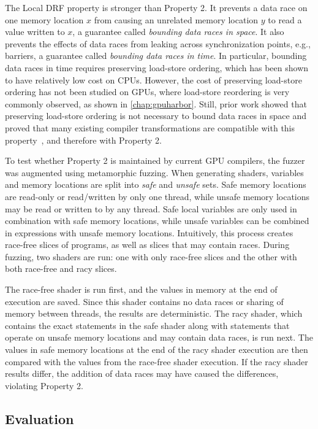 The Local DRF property is stronger than \smsg Property 2. It prevents a data race on one memory location $x$ from causing an unrelated memory location $y$ to read a value written to $x$, a guarantee called \textit{bounding data races in space}. It also prevents the effects of data races from leaking across synchronization points, e.g., barriers, a guarantee called \textit{bounding data races in time}. In particular, bounding data races in time requires preserving load-store ordering, which has been shown to have relatively low cost on CPUs. However, the cost of preserving load-store ordering has not been studied on GPUs, where load-store reordering is very commonly observed, as shown in \mychap\ref{chap:gpuharbor}. Still, prior work showed that preserving load-store ordering is not necessary to bound data races in space and proved that many existing compiler transformations are compatible with this property~\cite{dolan2018bounding}, and therefore with \smsg Property 2.

To test whether \smsg Property 2 is maintained by current GPU compilers, the \wgslmemsmith fuzzer was augmented using metamorphic fuzzing. When generating shaders, variables and memory locations are split into \textit{safe} and \textit{unsafe} sets. Safe memory locations are read-only or read/written by only one thread, while unsafe memory locations may be read or written to by any thread. Safe local variables are only used in combination with safe memory locations, while unsafe variables can be combined in expressions with unsafe memory locations. Intuitively, this process creates race-free slices of programs, as well as slices that may contain races. During fuzzing, two shaders are run: one with only race-free slices and the other with both race-free and racy slices.

The race-free shader is run first, and the values in memory at the end of execution are saved. Since this shader contains no data races or sharing of memory between threads, the results are deterministic. The racy shader, which contains the exact statements in the safe shader along with statements that operate on unsafe memory locations and may contain data races, is run next. The values in safe memory locations at the end of the racy shader execution are then compared with the values from the race-free shader execution. If the racy shader results differ, the addition of data races may have caused the differences, violating \smsg Property 2.

\subsection{Evaluation}

